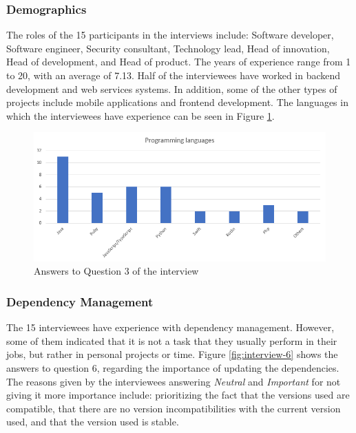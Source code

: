 \subsubsection{Demographics}

The roles of the 15 participants in the interviews include: Software developer, Software engineer, Security consultant, Technology lead, Head of innovation, Head of development, and Head of product. The years of experience range from 1 to 20, with an average of 7.13. Half of the interviewees have worked in backend development and web services systems. In addition, some of the other types of projects include mobile applications and frontend development. The languages in which the interviewees have experience can be seen in Figure \ref{fig:interview-3}.

\begin{figure}[ht!]
\begin{center}
\includegraphics[width=\textwidth]{figures/interview/Question3.png}
\caption{Answers to Question 3 of the interview}
\label{fig:interview-3}
\end{center}
\end{figure}

\subsubsection{Dependency Management}

The 15 interviewees have experience with dependency management. However, some of them indicated that it is not a task that they usually perform in their jobs, but rather in personal projects or time. Figure \ref{fig:interview-6} shows the answers to question 6, regarding the importance of updating the dependencies. The reasons given by the interviewees answering \textit{Neutral} and \textit{Important} for not giving it more importance include: prioritizing the fact that the versions used are compatible, that there are no version incompatibilities with the current version used, and that the version used is stable.

